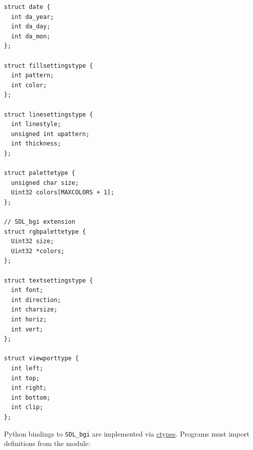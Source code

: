 \documentclass[a4paper,12pt]{article}
\newcommand{\ntt}[1]{\texttt{\textls[-40]{#1}}}
\newcommand{\T}[1]{\ntt{#1}}     %
\newcommand{\SDLbgi}{\texttt{SDL\_bgi}}
\begin{document}
\begin{footnotesize}
\begin{spacing}{0.8}
\begin{verbatim}
struct date {
  int da_year;
  int da_day;
  int da_mon;
};

struct fillsettingstype {
  int pattern;
  int color;
};

struct linesettingstype {
  int linestyle;
  unsigned int upattern;
  int thickness;
};

struct palettetype {
  unsigned char size;
  Uint32 colors[MAXCOLORS + 1];
};

// SDL_bgi extension
struct rgbpalettetype {
  Uint32 size;
  Uint32 *colors;
};

struct textsettingstype {
  int font;
  int direction;
  int charsize;
  int horiz;
  int vert;
};

struct viewporttype {
  int left;
  int top;
  int right;
  int bottom;
  int clip;
};
\end{verbatim}
\end{spacing}
\end{footnotesize}

Python bindings to \SDLbgi{} are implemented via
\href{https://docs.python.org/3/library/ctypes.html}{ctypes}. Programs
must import definitions from the \T{sdl\_bgi.py} module:
\end{document}
